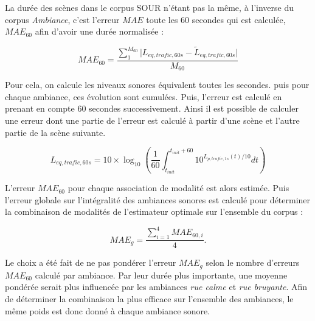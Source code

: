La durée des scènes dans le corpus SOUR n'étant pas la même, à l'inverse du corpus \textit{Ambiance}, c'est l'erreur $MAE$ toute les 60 secondes qui est calculée, $MAE_{60}$ afin d'avoir une durée normalisée : 

\begin{equation}
MAE_{60} = \frac{\sum_{1}^{M_60}\vert L_{eq,trafic,60s} - \tilde{L}_{eq,trafic,60s}\vert}{M_{60}}
\end{equation}

Pour cela, on calcule les niveaux sonores équivalent toutes les secondes. puis pour chaque ambiance, ces évolution sont cumulées. Puis, l'erreur est calculé en prenant en compte 60 secondes successivement. Ainsi il est possible de calculer une erreur dont une partie de l'erreur est calculé à partir d'une scène et l'autre partie de la scène suivante.

\begin{equation}
L_{eq,trafic,60s} = 10 \times \log_{10}\left(\frac{1}{60}\int_{t_{init}}^{t_{init}+60} 10^{L_{p,trafic,1s}(t)/10} dt\right)
\end{equation}

L'erreur $MAE_{60}$ pour chaque association de modalité est alors estimée. Puis l'erreur globale sur l'intégralité des ambiances sonores est calculé pour déterminer la combinaison de modalités de l'estimateur optimale sur l'ensemble du corpus :
  
\begin{equation}
MAE_{g} = \frac{\sum_{i = 1}^4 MAE_{60,i}}{4}.
\end{equation}

Le choix a été fait de ne pas pondérer l'erreur $MAE_{g}$ selon le nombre d'erreurs $MAE_{60}$ calculé par ambiance. Par leur durée plus importante, une moyenne pondérée serait plus influencée par les ambiances \textit{rue calme} et \textit{rue bruyante}. Afin de déterminer la combinaison la plus efficace sur l'ensemble des ambiances, le même poids est donc donné à chaque ambiance sonore.


